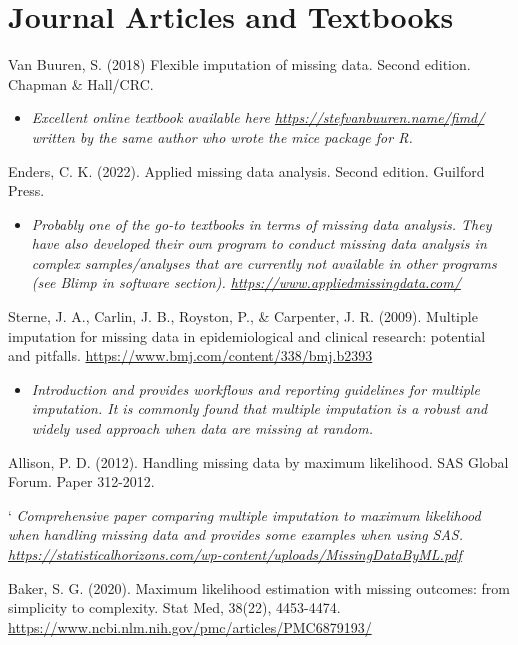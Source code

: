 \documentclass[
]{book}
\providecommand{\tightlist}{%
  \setlength{\itemsep}{0pt}\setlength{\parskip}{0pt}}
\begin{document}
\section{Journal Articles and Textbooks}\label{journal-articles-and-textbooks-5}

Van Buuren, S. (2018) Flexible imputation of missing data. Second edition. Chapman \& Hall/CRC.

\begin{itemize}
\tightlist
\item
  \emph{Excellent online textbook available here \url{https://stefvanbuuren.name/fimd/} written by the same author who wrote the mice package for R. }
\end{itemize}

Enders, C. K. (2022). Applied missing data analysis. Second edition. Guilford Press.

\begin{itemize}
\tightlist
\item
  \emph{Probably one of the go-to textbooks in terms of missing data analysis. They have also developed their own program to conduct missing data analysis in complex samples/analyses that are currently not available in other programs (see Blimp in software section). \url{https://www.appliedmissingdata.com/} }
\end{itemize}

Sterne, J. A., Carlin, J. B., Royston, P., \& Carpenter, J. R. (2009). Multiple imputation for missing data in epidemiological and clinical research: potential and pitfalls. \url{https://www.bmj.com/content/338/bmj.b2393}

\begin{itemize}
\tightlist
\item
  \emph{Introduction and provides workflows and reporting guidelines for multiple imputation. It is commonly found that multiple imputation is a robust and widely used approach when data are missing at random.}
\end{itemize}

Allison, P. D. (2012). Handling missing data by maximum likelihood. SAS Global Forum. Paper 312-2012.

` \emph{Comprehensive paper comparing multiple imputation to maximum likelihood when handling missing data and provides some examples when using SAS. \url{https://statisticalhorizons.com/wp-content/uploads/MissingDataByML.pdf} }

Baker, S. G. (2020). Maximum likelihood estimation with missing outcomes: from simplicity to complexity. Stat Med, 38(22), 4453-4474. \url{https://www.ncbi.nlm.nih.gov/pmc/articles/PMC6879193/}
\end{document}
